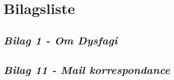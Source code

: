 \chapter{Bilagsliste}

\section{\textit{Bilag 1 - Om Dysfagi}}
\section{\textit{Bilag 11 - Mail korrespondance}}
\label{bilag1}

